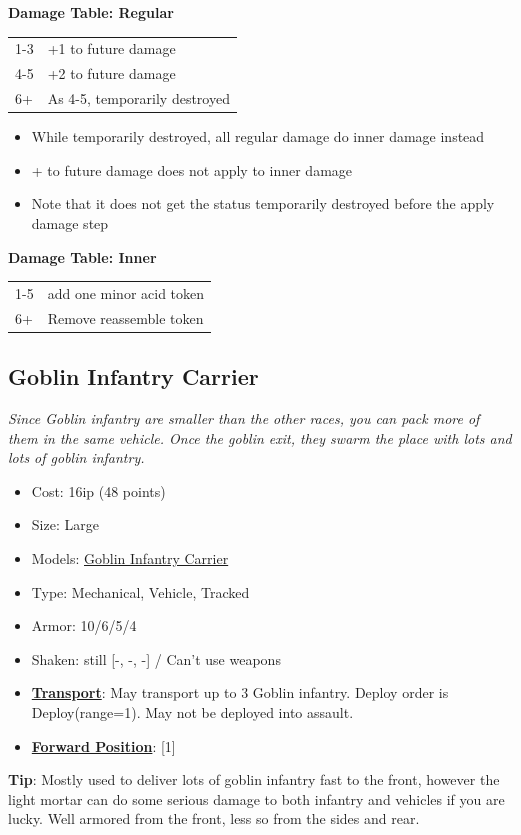 \documentclass[a4paper,12pt]{article}
\begin{document}
\noindent\textbf{Damage Table: Regular}

\begin{tabular}{@{}lp{}@{}}
1-3 & +1 to future damage \\
4-5 & +2 to future damage \\
6+ & As 4-5, temporarily destroyed \\
\end{tabular}
\begin{itemize}
\item While temporarily destroyed, all regular damage do inner damage instead
\item + to future damage does not apply to inner damage
\item Note that it does not get the status temporarily destroyed before the apply damage step
\end{itemize}
\vspace{1ex}

\noindent\textbf{Damage Table: Inner}

\begin{tabular}{@{}lp{}@{}}
1-5 & add one minor acid token \\
6+ & Remove reassemble token \\
\end{tabular}
\vspace{1ex}
\subsection{Goblin Infantry Carrier}
\label{unit-goblin-infantry-carrier}

\textit{Since Goblin infantry are smaller than the other races, you can pack more of them in the same vehicle. Once the goblin exit, they swarm the place with lots and lots of goblin infantry.}

\begin{itemize}
\item Cost: 16ip (48 points)
\item Size: Large
\item Models: \hyperref[model-goblin-infantry-carrier]{Goblin Infantry Carrier}
\item Type: Mechanical, Vehicle, Tracked
\item Armor: 10/6/5/4
\item Shaken: still [-, -, -] / Can't use weapons
\item \textbf{\hyperref[rule-special-transport]{Transport}}: May transport up to 3 Goblin infantry. Deploy order is Deploy(range=1). May not be deployed into assault.
\item \textbf{\hyperref[rule-special-forward-position]{Forward Position}}: [1]

\end{itemize}
\noindent\textbf{Tip}: Mostly used to deliver lots of goblin infantry fast to the front, however the light mortar can do some serious damage to both infantry and vehicles if you are lucky. Well armored from the front, less so from the sides and rear.
\end{document}
